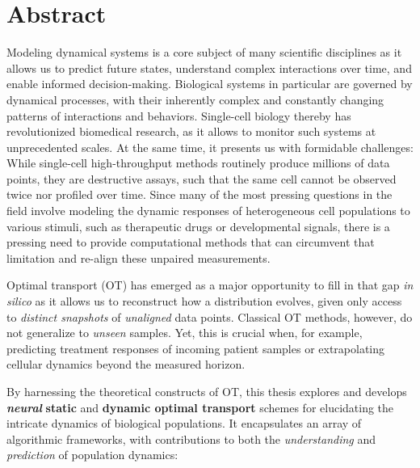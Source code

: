 \begingroup
\let\clearpage\relax
\let\cleardoublepage\relax
\let\cleardoublepage\relax

\chapter*{Abstract}

Modeling dynamical systems is a core subject of many scientific disciplines as it allows us to predict future states, understand complex interactions over time, and enable informed decision-making.
Biological systems in particular are governed by dynamical processes, with their inherently complex and constantly changing patterns of interactions and behaviors.
Single-cell biology thereby has revolutionized biomedical research, as it allows to monitor such systems at unprecedented scales.
At the same time, it presents us with formidable challenges: While single-cell high-throughput methods routinely produce millions of data points, they are destructive assays, such that the same cell cannot be observed twice nor profiled over time.
Since many of the most pressing questions in the field involve modeling the dynamic responses of heterogeneous cell populations to various stimuli, such as therapeutic drugs or developmental signals, there is a pressing need to provide computational methods that can circumvent that limitation and re-align these unpaired measurements.

Optimal transport (OT) has emerged as a major opportunity to fill in that gap \textit{in silico} as it allows us to reconstruct how a distribution evolves, given only access to \emph{distinct snapshots} of \emph{unaligned} data points.
Classical OT methods, however, do not generalize to \emph{unseen} samples. Yet, this is crucial when, for example, predicting treatment responses of incoming patient samples or extrapolating cellular dynamics beyond the measured horizon.

By harnessing the theoretical constructs of OT, this thesis explores and develops \textbf{\emph{neural}} \textbf{static} and \textbf{dynamic optimal transport} schemes for elucidating the intricate dynamics of biological populations. It encapsulates an array of algorithmic frameworks, with contributions to both the \textit{understanding} and \textit{prediction} of population dynamics:

